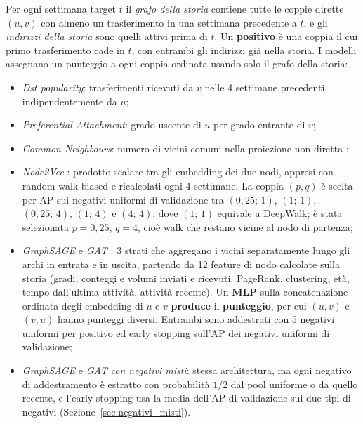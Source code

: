 \documentclass[11pt]{article}
\begin{document}
Per ogni settimana target $t$ il \emph{grafo della storia} contiene tutte
le coppie dirette $(u, v)$ con almeno un trasferimento in una settimana
precedente a $t$, e gli \emph{indirizzi della storia} sono quelli attivi
prima di $t$. Un \textbf{positivo} è una coppia il cui primo trasferimento
cade in $t$, con entrambi gli indirizzi già nella storia. I modelli
assegnano un punteggio a ogni coppia ordinata usando solo il grafo della
storia:
\begin{itemize}
    \item \emph{Dst popularity}: trasferimenti ricevuti da $v$ nelle 4
    settimane precedenti, indipendentemente da $u$;
    \item \emph{Preferential Attachment}: grado uscente di $u$ per grado
    entrante di $v$;
    \item \emph{Common Neighbours}: numero di vicini comuni
    nella proiezione non diretta \cite{libennowell2007linkprediction};
    \item \emph{Node2Vec} \cite{grover2016node2vec}: prodotto scalare tra
    gli embedding dei due nodi, appresi con random walk biased e
    ricalcolati ogni 4 settimane. La coppia $(p, q)$ è scelta per AP sui
    negativi uniformi di validazione tra $(0{,}25;\,1)$, $(1;\,1)$,
    $(0{,}25;\,4)$, $(1;\,4)$ e $(4;\,4)$, dove $(1;\,1)$ equivale a DeepWalk;
    è stata selezionata $p = 0{,}25$, $q = 4$, cioè walk che restano vicine
    al nodo di partenza;
    \item \emph{GraphSAGE} \cite{hamilton2017graphsage} e \emph{GAT}
    \cite{velickovic2018gat}: 3 strati che aggregano i vicini separatamente
    lungo gli archi in entrata e in uscita, partendo da 12 feature di nodo
    calcolate sulla storia (gradi, conteggi e volumi inviati e ricevuti,
    PageRank, clustering, età, tempo dall'ultima attività, attività
    recente). Un \textbf{MLP} sulla concatenazione ordinata degli embedding di $u$ e
    $v$ \textbf{produce} il \textbf{punteggio}, per cui $(u, v)$ e $(v, u)$ hanno punteggi
    diversi. Entrambi sono addestrati con 5 negativi uniformi per positivo
    ed early stopping sull'AP dei negativi uniformi di validazione;
    \item \emph{GraphSAGE} e \emph{GAT} \emph{con negativi misti}: stessa
    architettura, ma ogni negativo di addestramento è estratto con
    probabilità $1/2$ dal pool uniforme o da quello recente, e l'early
    stopping usa la media dell'AP di validazione sui due tipi di negativi
    (Sezione~\ref{sec:negativi_misti}).
\end{itemize}
\end{document}
